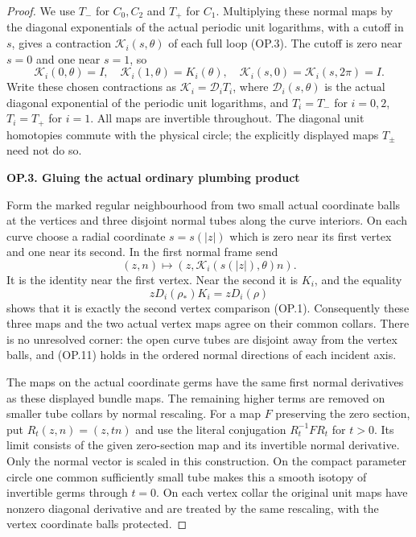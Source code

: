 \begin{proof}
We use \(T_-\) for \(C_0,C_2\) and \(T_+\) for \(C_1\).
Multiplying these normal maps by the diagonal exponentials of the
actual periodic unit logarithms, with a cutoff in \(s\), gives a
contraction \(\mathcal K_i(s,\theta)\) of each full loop (OP.3).
The cutoff is zero near \(s=0\) and one near \(s=1\), so
\[
 \mathcal K_i(0,\theta)=I,\quad
 \mathcal K_i(1,\theta)=K_i(\theta),\quad
 \mathcal K_i(s,0)=\mathcal K_i(s,2\pi)=I.             \tag{OP.9}
\]
Write these chosen contractions as
\(\mathcal K_i=\mathcal D_iT_i\), where \(\mathcal D_i(s,\theta)\)
is the actual diagonal exponential of the periodic unit logarithms,
and \(T_i=T_-\) for \(i=0,2\), \(T_i=T_+\) for \(i=1\).
All maps are invertible throughout. The diagonal unit homotopies
commute with the physical circle; the explicitly displayed maps
\(T_\pm\) need not do so.

\par

\medskip\noindent\textbf{OP.3. Gluing the actual ordinary plumbing product}

\par\nobreak

Form the marked regular neighbourhood from two small actual coordinate
balls at the vertices and three disjoint normal tubes along the curve
interiors. On each curve choose a radial coordinate \(s=s(|z|)\)
which is zero near its first vertex and one near its second. In the
first normal frame send
\[
                    (z,n)\longmapsto
                       (z,\mathcal K_i(s(|z|),\theta)n).
                                                               \tag{OP.10}
\]
It is the identity near the first vertex. Near the second it is
\(K_i\), and the equality
\[
               zD_i(\rho_*)K_i=zD_i(\rho)            \tag{OP.11}
\]
shows that it is exactly the second vertex comparison (OP.1).
Consequently these three maps and the two actual vertex maps agree
on their common collars. There is no unresolved corner: the open
curve tubes are disjoint away from the vertex balls, and (OP.11)
holds in the ordered normal directions of each incident axis.

The maps on the actual coordinate germs have the same first normal
derivatives as these displayed bundle maps. The remaining higher
terms are removed on smaller tube collars by normal rescaling.
For a map \(F\) preserving the zero section, put
\(R_t(z,n)=(z,tn)\) and use the literal conjugation
\(R_t^{-1}FR_t\) for \(t>0\). Its limit consists of the given
zero-section map and its invertible normal derivative. Only the
normal vector is scaled in this construction. On the compact parameter circle
one common sufficiently small tube makes this a smooth isotopy of
invertible germs through \(t=0\). On each vertex collar the original
unit maps have nonzero diagonal derivative and are treated by the
same rescaling, with the vertex coordinate balls protected.


\end{proof}
